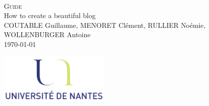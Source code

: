 \documentclass[a4paper,10pt]{article}
\begin{document}
\fancyhead[LE,CE,RE,LO,CO,RO]{}
\fancyfoot[LE,CE,RE,LO,CO,RO]{}
\renewcommand{\headrulewidth}{0.4pt}
\renewcommand{\footrulewidth}{0.4pt}

\begin{titlepage}

\vspace*{\fill}~
\begin{center}
{\large \textsc{Guide}} \\
\vspace{1cm}
{\LARGE How to create a beautiful blog} \\
\vspace{1cm}
COUTABLE Guillaume, MENORET Clément, RULLIER Noémie, WOLLENBURGER Antoine \\
\today
\end{center}
\vspace*{\fill}

\begin{center}
\noindent 
\includegraphics[height=2.5cm]{Images/universite.png}
\end{center}
\pagebreak
\end{titlepage}

\newpage
\tableofcontents 

\newpage
\pagestyle{fancy}


\end{document}
